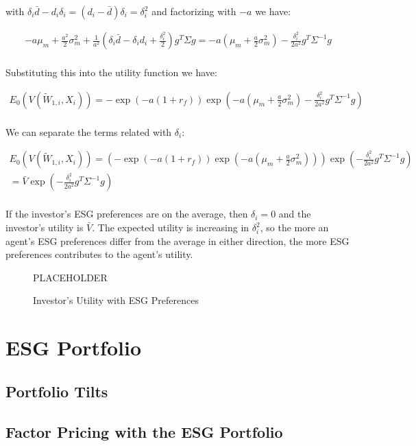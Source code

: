 with $\delta_i \bar{d} - d_i \delta_i = (d_i - \bar{d})\delta_i = \delta_i^2$ and 
factorizing with $-a$ we have:

\begin{equation}
    \begin{aligned}
        -a \mu_m + \frac{a^2}{2} \sigma^2_m + \frac{1}{a^2} ( \delta_i \bar{d} - \delta_i d_i + \frac{\delta_i^2}{2}) g^T \Sigma g = -a(\mu_m + \frac{a}{2}\sigma^2_m) - \frac{\delta_i^2}{2a^2}g^T \Sigma^{-1} g\\
    \end{aligned}
\end{equation}

Substituting this into the utility function we have:

\begin{equation}
    \begin{aligned}
        E_0(V(\tilde{W}_{1,i}, X_i)) = -\exp{(-a(1 + r_f))} \exp{(-a(\mu_m + \frac{a}{2}\sigma^2_m) - \frac{\delta_i^2}{2a^2}g^T \Sigma^{-1} g)} \\
    \end{aligned}
\end{equation}

We can separate the terms related with $\delta_i$: 

\begin{equation}
    \begin{aligned}
        E_0(V(\tilde{W}_{1,i}, X_i)) = (-\exp{(-a(1 + r_f))} \exp{(-a(\mu_m + \frac{a}{2}\sigma^2_m))}) \exp{(-\frac{\delta_i^2}{2a^2}g^T \Sigma^{-1} g)} \\
        = \bar{V} \exp{(-\frac{\delta_i^2}{2a^2}g^T \Sigma^{-1} g)} \\
    \end{aligned}
\end{equation}

If the investor's ESG preferences are on the average, then $\delta_i = 0$ and
the investor's utility is $\bar{V}$. The expected utility 
is increasing in $\delta_i^2$, so the more an agent's ESG preferences 
differ from the average in either direction, the more ESG preferences
contributes to the agent's utility.


\begin{figure}
    \centering
    PLACEHOLDER
    \caption{Investor's Utility with ESG Preferences}
    \label{fig:esg_utility}
\end{figure}

\newpage
\section{ESG Portfolio}



\subsection{Portfolio Tilts}


\subsection{Factor Pricing with the ESG Portfolio}